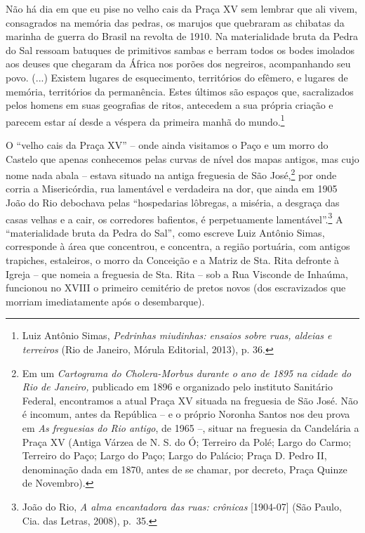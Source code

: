 Não há dia em que eu pise no velho cais da Praça XV sem lembrar que ali
vivem, consagrados na memória das pedras, os marujos que quebraram as
chibatas da marinha de guerra do Brasil na revolta de 1910. Na
materialidade bruta da Pedra do Sal ressoam batuques de primitivos
sambas e berram todos os bodes imolados aos deuses que chegaram da
África nos porões dos negreiros, acompanhando seu povo. (...) Existem
lugares de esquecimento, territórios do efêmero, e lugares de memória,
territórios da permanência. Estes últimos são espaços que, sacralizados
pelos homens em suas geografias de ritos, antecedem a sua própria
criação e parecem estar aí desde a véspera da primeira manhã do
mundo.\footnote{Luiz Antônio Simas, \emph{Pedrinhas miudinhas: ensaios
  sobre ruas, aldeias e terreiros} (Rio de Janeiro, Mórula Editorial,
  2013), p. 36.}

O ``velho cais da Praça XV'' -- onde ainda visitamos o Paço e um morro
do Castelo que apenas conhecemos pelas curvas de nível dos mapas
antigos, mas cujo nome nada abala -- estava situado na antiga freguesia
de São José,\footnote{Em um \emph{Cartograma do Cholera-Morbus durante o
  ano de 1895 na cidade do Rio de Janeiro,} publicado em 1896 e
  organizado pelo instituto Sanitário Federal, encontramos a atual Praça
  XV situada na freguesia de São José. Não é incomum, antes da República
  -- e o próprio Noronha Santos nos deu prova em \emph{As freguesias do
  Rio antigo}, de 1965 --, situar na freguesia da Candelária a Praça XV
  (Antiga Várzea de N. S. do Ó; Terreiro da Polé; Largo do Carmo;
  Terreiro do Paço; Largo do Paço; Largo do Palácio; Praça D. Pedro II,
  denominação dada em 1870, antes de se chamar, por decreto, Praça
  Quinze de Novembro).} por onde corria a Misericórdia, rua lamentável e
verdadeira na dor, que ainda em 1905 João do Rio debochava pelas
``hospedarias lôbregas, a miséria, a desgraça das casas velhas e a cair,
os corredores bafientos, é perpetuamente lamentável''.\footnote{João do
  Rio, \emph{A alma encantadora das ruas: crônicas} {[}1904-07{]} (São
  Paulo, Cia. das Letras, 2008), p.~35.} A ``materialidade bruta da
Pedra do Sal'', como escreve Luiz Antônio Simas, corresponde à área que
concentrou, e concentra, a região portuária, com antigos trapiches,
estaleiros, o morro da Conceição e a Matriz de Sta. Rita defronte à
Igreja -- que nomeia a freguesia de Sta. Rita -- sob a Rua Visconde de
Inhaúma, funcionou no XVIII o primeiro cemitério de pretos novos (dos
escravizados que morriam imediatamente após o desembarque).


